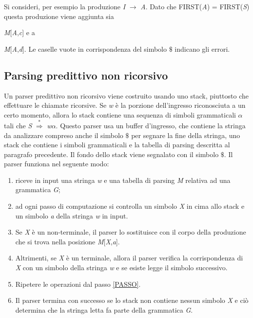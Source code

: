 \noindent Si consideri, per esempio la produzione \textit{I} $\to$ \textit{A}. Dato che FIRST(\textit{A}) = FIRST(\textit{S}) questa produzione viene aggiunta sia {\textit{M}[\textit{A},\textit{c}] e a {\textit{M}[\textit{A},\textit{d}]. Le caselle vuote in corrispondenza del simbolo $\$$ indicano gli errori.
\subsection{Parsing predittivo non ricorsivo}
Un parser predittivo non ricorsivo \cite{libro: compilatori} viene costruito usando uno stack, piuttosto che effettuare le chiamate ricorsive. Se \textit{w} è la porzione dell'ingresso riconosciuta a un certo momento, allora lo stack contiene una sequenza di simboli grammaticali $\alpha$ tali che \textit{S} $\overset{*}{\Rightarrow}$ \textit{w}$\alpha$. Questo parser usa un buffer d'ingresso, che contiene la stringa da analizzare compreso anche il simbolo $\$$ per segnare la fine della stringa, uno stack che contiene i simboli grammaticali e la tabella di parsing descritta al paragrafo precedente. Il fondo dello stack viene segnalato con il simbolo $\$$. Il parser funziona nel seguente modo:
\begin{enumerate}
	\item riceve in input una stringa \textit{w} e una tabella di parsing \textit{M} relativa ad una grammatica \textit{G};
	\item \label{PASSO} ad ogni passo di computazione si controlla un simbolo \textit{X} in cima allo stack e un simbolo \textit{a} della stringa \textit{w} in input.
	\item Se \textit{X} è un non-terminale, il parser lo sostituisce con il corpo della produzione che si trova nella posizione \textit{M}[\textit{X},\textit{a}].
	\item Altrimenti, se \textit{X} è un terminale, allora il parser verifica la corrispondenza di \textit{X} con un simbolo della stringa \textit{w} e se esiste legge il simbolo successivo.
	\item Ripetere le operazioni dal passo \ref{PASSO}.
	\item Il parser termina con successo se lo stack non contiene nessun simbolo \textit{X} e ciò determina che la stringa letta fa parte della grammatica \textit{G}.
\end{enumerate}

}}
